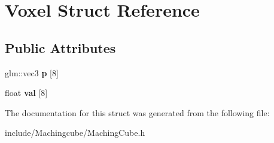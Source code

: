 \hypertarget{structVoxel}{}\section{Voxel Struct Reference}
\label{structVoxel}
\subsection*{Public Attributes}
\begin{DoxyCompactItemize}
\item 
glm\+::vec3 {\bfseries p} \mbox{[}8\mbox{]}\hypertarget{structVoxel_a5084294efff330eafa50a6111422ecba}{}\label{structVoxel_a5084294efff330eafa50a6111422ecba}

\item 
float {\bfseries val} \mbox{[}8\mbox{]}\hypertarget{structVoxel_af542ae384c303a9d4c058052ee16be09}{}\label{structVoxel_af542ae384c303a9d4c058052ee16be09}

\end{DoxyCompactItemize}


The documentation for this struct was generated from the following file\+:\begin{DoxyCompactItemize}
\item 
include/\+Machingcube/Maching\+Cube.\+h\end{DoxyCompactItemize}
